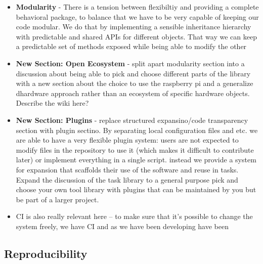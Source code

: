 \begin{itemize}
\item \textbf{Modularity} - There is a tension between flexibiltiy and providing a complete behavioral package, to balance that we have to be very capable of keeping our code modular. We do that by implementing a sensible inheritance hierarchy with predictable and shared APIs for different objects. That way we can keep a predictable set of methods exposed while being able to modify the other  
\item \textbf{New Section: Open Ecosystem} - split apart modularity section into a discussion about being able to pick and choose different parts of the library with a new section about the choice to use the raspberry pi and a generalize dhardware approach rather than an ecosystem of specific hardware objects. Describe the wiki here?
\item \textbf{New Section: Plugins} - replace structured expansino/code transparency section with plugin sectino. By separating local configuration files and etc. we are able to have a very flexible plugin system: users are not expected to modify files in the repository to use it (which makes it difficult to contribute later) or implement everything in a single script. instead we provide a system for expansion that scaffolds their use of the software and reuse in tasks. Expand the discussion of the task library to a general purpose pick and choose your own tool library with plugins that can be maintained by you but be part of a larger project.
\item CI is also really relevant here -- to make sure that it's possible to change the system freely, we have CI and as we have been developing have been 

\end{itemize}

\subsection{Reproducibility}

